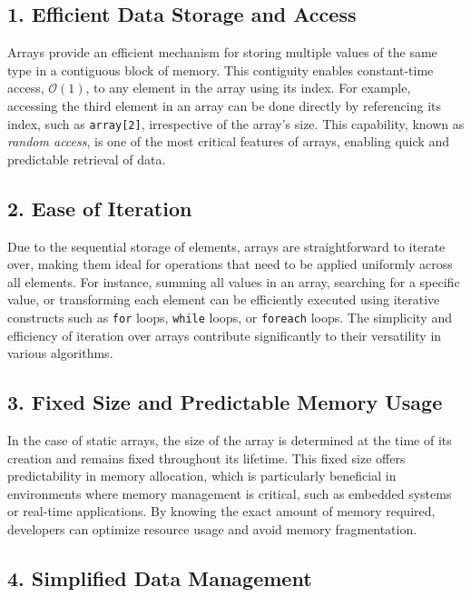 \documentclass{book}
\begin{document}
\subsection{1. Efficient Data Storage and Access}

Arrays provide an efficient mechanism for storing multiple values of the same type in a contiguous block of memory. This contiguity enables constant-time access, $\mathcal{O}(1)$, to any element in the array using its index. For example, accessing the third element in an array can be done directly by referencing its index, such as \texttt{array[2]}, irrespective of the array's size. This capability, known as \textit{random access}, is one of the most critical features of arrays, enabling quick and predictable retrieval of data.

\subsection{2. Ease of Iteration}

Due to the sequential storage of elements, arrays are straightforward to iterate over, making them ideal for operations that need to be applied uniformly across all elements. For instance, summing all values in an array, searching for a specific value, or transforming each element can be efficiently executed using iterative constructs such as \texttt{for} loops, \texttt{while} loops, or \texttt{foreach} loops. The simplicity and efficiency of iteration over arrays contribute significantly to their versatility in various algorithms.

\subsection{3. Fixed Size and Predictable Memory Usage}

In the case of static arrays, the size of the array is determined at the time of its creation and remains fixed throughout its lifetime. This fixed size offers predictability in memory allocation, which is particularly beneficial in environments where memory management is critical, such as embedded systems or real-time applications. By knowing the exact amount of memory required, developers can optimize resource usage and avoid memory fragmentation.

\subsection{4. Simplified Data Management}
\end{document}
